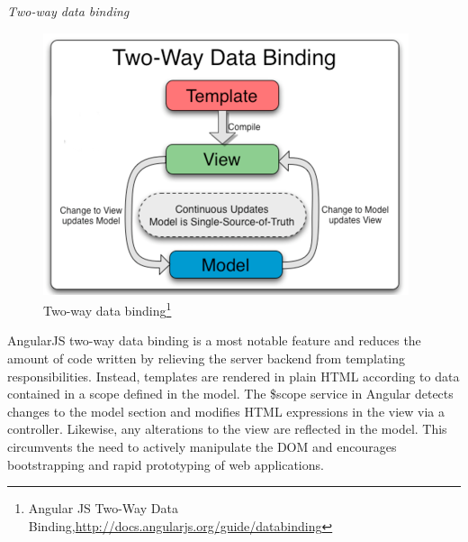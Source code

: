    \emph{Two-way data binding}
        \begin{figure}[!ht]
		\centering
		\includegraphics[scale=0.8]{images/2wayBinding.png}   
		\caption[Two-way data binding]{Two-way data binding\footnote{Angular JS Two-Way Data Binding,\url{http://docs.angularjs.org/guide/databinding}}}                         
		\end{figure}
	AngularJS two-way data binding is a most notable feature and reduces the amount of code written by relieving the server backend from templating responsibilities. Instead, templates are rendered in plain HTML according to data contained in a scope defined in the model. The \$scope service in Angular detects changes to the model section and modifies HTML expressions in the view via a controller. Likewise, any alterations to the view are reflected in the model. This circumvents the need to actively manipulate the DOM and encourages bootstrapping and rapid prototyping of web applications.

